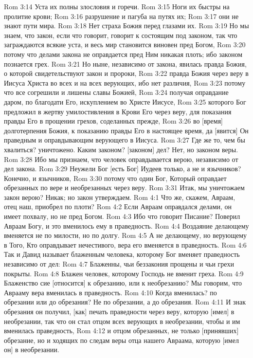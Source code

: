 Rom 3:14  Уста их полны злословия и горечи.
Rom 3:15  Ноги их быстры на пролитие крови;
Rom 3:16  разрушение и пагуба на путях их;
Rom 3:17  они не знают пути мира.
Rom 3:18  Нет страха Божия перед глазами их.
Rom 3:19  Но мы знаем, что закон, если что говорит, говорит к состоящим под законом, так что заграждаются всякие уста, и весь мир становится виновен пред Богом,
Rom 3:20  потому что делами закона не оправдается пред Ним никакая плоть; ибо законом познается грех.
Rom 3:21  Но ныне, независимо от закона, явилась правда Божия, о которой свидетельствуют закон и пророки,
Rom 3:22  правда Божия через веру в Иисуса Христа во всех и на всех верующих, ибо нет различия,
Rom 3:23  потому что все согрешили и лишены славы Божией,
Rom 3:24  получая оправдание даром, по благодати Его, искуплением во Христе Иисусе,
Rom 3:25  которого Бог предложил в жертву умилостивления в Крови Его через веру, для показания правды Его в прощении грехов, соделанных прежде,
Rom 3:26  во [время] долготерпения Божия, к показанию правды Его в настоящее время, да [явится] Он праведным и оправдывающим верующего в Иисуса.
Rom 3:27  Где же то, чем бы хвалиться? уничтожено. Каким законом? [законом] дел? Нет, но законом веры.
Rom 3:28  Ибо мы признаем, что человек оправдывается верою, независимо от дел закона.
Rom 3:29  Неужели Бог [есть Бог] Иудеев только, а не и язычников? Конечно, и язычников,
Rom 3:30  потому что один Бог, Который оправдает обрезанных по вере и необрезанных через веру.
Rom 3:31  Итак, мы уничтожаем закон верою? Никак; но закон утверждаем.
Rom 4:1  Что же, скажем, Авраам, отец наш, приобрел по плоти?
Rom 4:2  Если Авраам оправдался делами, он имеет похвалу, но не пред Богом.
Rom 4:3  Ибо что говорит Писание? Поверил Авраам Богу, и это вменилось ему в праведность.
Rom 4:4  Воздаяние делающему вменяется не по милости, но по долгу.
Rom 4:5  А не делающему, но верующему в Того, Кто оправдывает нечестивого, вера его вменяется в праведность.
Rom 4:6  Так и Давид называет блаженным человека, которому Бог вменяет праведность независимо от дел:
Rom 4:7  Блаженны, чьи беззакония прощены и чьи грехи покрыты.
Rom 4:8  Блажен человек, которому Господь не вменит греха.
Rom 4:9  Блаженство сие [относится] к обрезанию, или к необрезанию? Мы говорим, что Аврааму вера вменилась в праведность.
Rom 4:10  Когда вменилась? по обрезании или до обрезания? Не по обрезании, а до обрезания.
Rom 4:11  И знак обрезания он получил, [как] печать праведности через веру, которую [имел] в необрезании, так что он стал отцом всех верующих в необрезании, чтобы и им вменилась праведность,
Rom 4:12  и отцом обрезанных, не только [принявших] обрезание, но и ходящих по следам веры отца нашего Авраама, которую [имел он] в необрезании.
